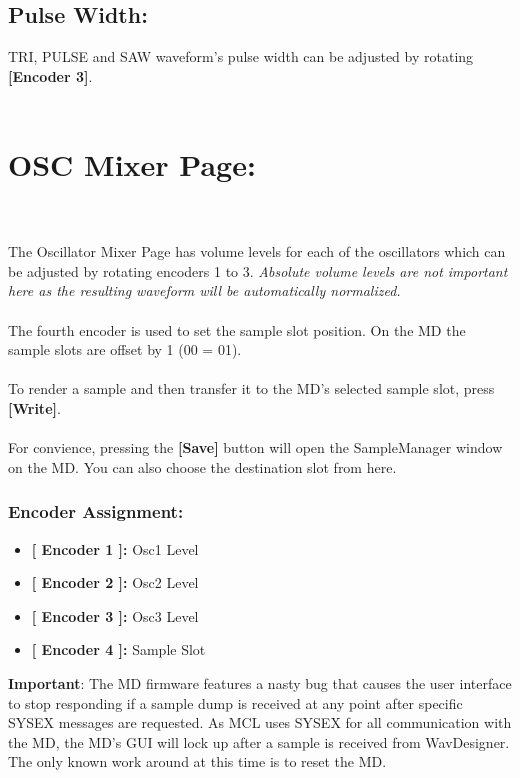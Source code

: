 \subsection{Pulse Width:}
TRI, PULSE and SAW waveform's pulse width can be adjusted by rotating \textbf{[Encoder 3]}.\\
\\
\newpage
\section{OSC Mixer Page:}
\\\\
The Oscillator Mixer Page has volume levels for each of the oscillators which can be adjusted by rotating encoders 1 to 3. \textit{Absolute volume levels are not important here as the resulting waveform will be automatically normalized.}\\
\\The fourth encoder is used to set the sample slot position. On the MD the sample slots are offset by 1 (00 = 01).\\
\\
To render a sample and then transfer it to the MD's selected sample slot, press \textbf{[Write]}.\\
\\
For convience, pressing the \textbf{[Save]} button will open the SampleManager window on the MD. You can also choose the destination slot from here.
\subsubsection{Encoder Assignment:}
\begin{itemize}
	\item \textbf{[ Encoder 1 ]: } Osc1 Level
	\item \textbf{[ Encoder 2 ]: } Osc2 Level
	\item \textbf{[ Encoder 3 ]: } Osc3 Level
	\item \textbf{[ Encoder 4 ]: } Sample Slot
\end{itemize}
\textbf{Important}: The MD firmware features a nasty bug that causes the user interface to stop responding if a sample dump is received at any point after specific SYSEX messages are requested. As MCL uses SYSEX for all communication with the MD, the MD's GUI will lock up after a sample is received from WavDesigner. The only known work around at this time is to reset the MD.